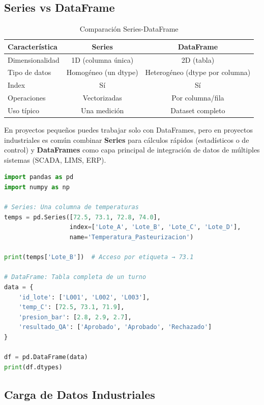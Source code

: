 \documentclass[11pt, a4paper]{article}
\begin{document}
\subsection{Series vs DataFrame}

\begin{table}[h]
\centering
\begin{tabular}{@{}lcc@{}}
\toprule
\textbf{Característica} & \textbf{Series} & \textbf{DataFrame} \\
\midrule
Dimensionalidad & 1D (columna única) & 2D (tabla) \\
Tipo de datos & Homogéneo (un dtype) & Heterogéneo (dtype por columna) \\
Index & Sí & Sí \\
Operaciones & Vectorizadas & Por columna/fila \\
Uso típico & Una medición & Dataset completo \\
\bottomrule
\end{tabular}
\caption{Comparación Series-DataFrame}
\end{table}

En proyectos pequeños puedes trabajar solo con DataFrames, pero en proyectos industriales es común combinar \textbf{Series} para cálculos rápidos (estadísticos o de control) y \textbf{DataFrames} como capa principal de integración de datos de múltiples sistemas (SCADA, LIMS, ERP).

\begin{lstlisting}[language=Python, caption={Crear Series y DataFrame desde código}]
import pandas as pd
import numpy as np

# Series: Una columna de temperaturas
temps = pd.Series([72.5, 73.1, 72.8, 74.0],
                  index=['Lote_A', 'Lote_B', 'Lote_C', 'Lote_D'],
                  name='Temperatura_Pasteurizacion')

print(temps['Lote_B'])  # Acceso por etiqueta → 73.1

# DataFrame: Tabla completa de un turno
data = {
    'id_lote': ['L001', 'L002', 'L003'],
    'temp_C': [72.5, 73.1, 71.9],
    'presion_bar': [2.8, 2.9, 2.7],
    'resultado_QA': ['Aprobado', 'Aprobado', 'Rechazado']
}

df = pd.DataFrame(data)
print(df.dtypes)
\end{lstlisting}

\subsection{Carga de Datos Industriales}
\end{document}
